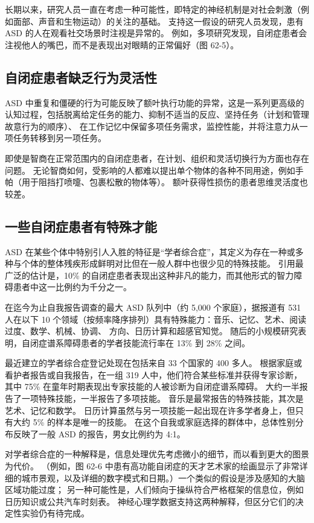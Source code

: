 长期以来，研究人员一直在考虑一种可能性，即特定的神经机制是对社会刺激（例如面部、声音和生物运动）的关注的基础。 支持这一假设的研究人员发现，患有 ASD 的人在观看社交场景时注视是异常的。 例如，多项研究发现，自闭症患者会注视他人的嘴巴，而不是表现出对眼睛的正常偏好（图 62-5）。

\subsection{自闭症患者缺乏行为灵活性}
ASD 中重复和僵硬的行为可能反映了额叶执行功能的异常，这是一系列更高级的认知过程，包括脱离给定任务的能力、抑制不适当的反应、坚持任务（计划和管理故意行为的顺序）、 在工作记忆中保留多项任务需求，监控性能，并将注意力从一项任务转移到另一项任务。

即使是智商在正常范围内的自闭症患者，在计划、组织和灵活切换行为方面也存在问题。 无论智商如何，受影响的人都难以提出单个物体的各种不同用途，例如手帕（用于阻挡打喷嚏、包裹松散的物体等）。 额叶获得性损伤的患者思维灵活度也较差。

\subsection{一些自闭症患者有特殊才能}

ASD 在某些个体中特别引人入胜的特征是“学者综合症”，其定义为存在一种或多种与个体的整体残疾形成鲜明对比但在一般人群中也很少见的特殊技能。 引用最广泛的估计是，10\% 的自闭症患者表现出这种非凡的能力，而其他形式的智力障碍患者中这一比例约为千分之一。

在迄今为止自我报告调查的最大 ASD 队列中（约 5,000 个家庭），据报道有 531 人在以下 10 个领域（按频率降序排列）具有特殊能力：音乐、记忆、艺术、阅读过度、数学、机械、协调、 方向、日历计算和超感官知觉。 随后的小规模研究表明，自闭症谱系障碍患者的学者技能流行率在 13\% 到 28\% 之间。

最近建立的学者综合症登记处现在包括来自 33 个国家的 400 多人。 根据家庭或看护者报告或自我报告，在一组 319 人中，他们符合某些标准并获得专家诊断，其中 75\% 在童年时期表现出专家技能的人被诊断为自闭症谱系障碍。 大约一半报告了一项特殊技能，一半报告了多项技能。 音乐是最常报告的特殊技能，其次是艺术、记忆和数学。 日历计算虽然与另一项技能一起出现在许多学者身上，但只有大约 5\% 的样本是唯一的技能。 在这个自我或家庭选择的群体中，总体性别分布反映了一般 ASD 的报告，男女比例约为 4:1。

对学者综合症的一种解释是，信息处理优先考虑微小的细节，而以看到更大的图景为代价。 （例如，图 62-6 中患有高功能自闭症的天才艺术家的绘画显示了非常详细的城市景观，以及详细的数字模式和日期。）一个类似的假设是涉及感知的大脑区域功能过度； 另一种可能性是，人们倾向于操纵符合严格框架的信息位，例如日历知识或公共汽车时刻表。 神经心理学数据支持这两种解释，但区分它们的决定性实验仍有待完成。

